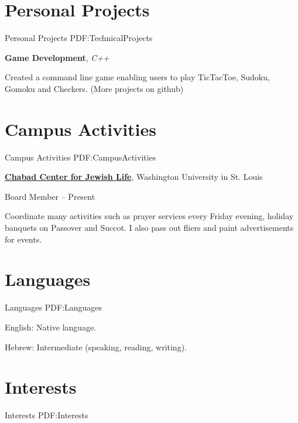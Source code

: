 \documentclass[letterpaper,10pt,oneside]{article}
\begin{document}
\begin{body}

\section{Personal
\newline Projects}
{Personal Projects}
{PDF:TechnicalProjects}

\textbf{Game Development},
\textit{C++}
\begin{detail}
\BulletItem
Created a command line game enabling users to play TicTacToe, Sudoku, Gomoku and Checkers.
\newline (More projects on github)
\end{detail}




\section
{Campus Activities}
{Campus Activities}
{PDF:CampusActivities}

\href{http://www.chabadwashu.org/}
{\textbf{Chabad Center for Jewish Life}},
Washington University in St. Louis

\GapNoBreak
\BulletItem
Board Member
\hfill
{} -- Present
\begin{detail}
\SubBulletItem
Coordinate many activities such as prayer services every Friday evening, holiday banquets on Passover and Succot. I also pass out fliers and paint advertisements for events.
\end{detail}




\section
{Languages}
{Languages}
{PDF:Languages}

\BulletItem
English: Native language.

\GapNoBreak
\BulletItem
Hebrew: Intermediate (speaking, reading, writing).




\section
{Interests}
{Interests}
{PDF:Interests}


\end{body}
\end{document}
